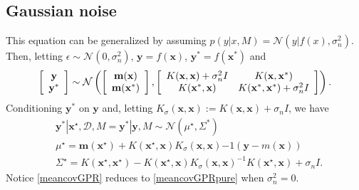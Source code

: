 \subsection{Gaussian noise}
This equation can be generalized by assuming $p(y|x,M) = \mathcal{N}(y|f(x),\sigma^2_n)$. Then, letting $\epsilon \sim \mathcal{N}(0,\sigma^2_n)$, $\mathbf{y} = f(\mathbf{x})$, $\mathbf{y}^* = f(\mathbf{x}^*)$ and
\begin{equation} \label{jointGPnoise}
\left[ \begin{array}{c} 
\mathbf{y} \\
\mathbf{y}^* \end{array} \right] \sim \mathcal{N} 
\left( \left[ \begin{array}{c}
\mathbf{m}(\mathbf{x}) \\
\mathbf{m}(\mathbf{x}^*) \end{array} \right] , 
\left[ \begin{array}{c c} 
K(\mathbf{x},\mathbf{x}) + \sigma_n^2 I & K(\mathbf{x},\mathbf{x}^*) \\
K(\mathbf{x}^*,\mathbf{x}) & K(\mathbf{x}^*,\mathbf{x}^*) + \sigma^2_n I \end{array} \right]
\right).
\end{equation}
Conditioning $\mathbf{y}^*$ on $\mathbf{y}$ and, letting $K_\sigma(\mathbf{x},\mathbf{x}) := K(\mathbf{x},\mathbf{x}) + \sigma_n I$, we have
\begin{equation}\label{meancovGPR}
\begin{split}
& \mathbf{y}^* | \mathbf{x}^\star, \mathcal{D}, M = \mathbf{y}^*|\mathbf{y},M \sim \mathcal{N}(\mu^\star,\Sigma^*) \\
& \mu^\star = \mathbf{m}(\mathbf{x}^\star) + K(\mathbf{x}^\star,\mathbf{x}) K_\sigma(\mathbf{x},\mathbf{x}){-1} (\mathbf{y} - m(\mathbf{x})) \\
& \Sigma^\star = K(\mathbf{x}^\star,\mathbf{x}^\star) - K(\mathbf{x}^\star,\mathbf{x}) K_\sigma(\mathbf{x},\mathbf{x})^{-1} K(\mathbf{x}^\star,\mathbf{x}) + \sigma_n I.
\end{split}
\end{equation}
Notice \eqref{meancovGPR} reduces to \eqref{meancovGPRpure} when $\sigma^2_n = 0$. 
